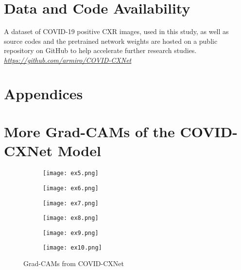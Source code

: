 \documentclass{article}
\begin{document}
\section*{Data and Code Availability}
A dataset of COVID-19 positive CXR images, used in this study, as well as source codes and the pretrained network weights are hosted on a public repository on GitHub to help accelerate further research studies.
\textit{\href{https://github.com/armiro/COVID-CXNet}{https://github.com/armiro/COVID-CXNet}}




\newpage
\appendix
\section*{Appendices}

\section{More Grad-CAMs of the COVID-CXNet Model} \label{appendix: B}

\begin{figure}[H]
\begin{subfigure}{0.4\linewidth}
        \centering
        \texttt{[image: ex5.png]}
        \label{fig:cx1_1}
    \end{subfigure}
    \hfill
    \begin{subfigure}{0.4\linewidth}
        \centering
        \texttt{[image: ex6.png]}
        \label{fig:cx1_2}
    \end{subfigure}
    \hfill
    \begin{subfigure}{0.4\linewidth}
        \centering
        \texttt{[image: ex7.png]}
        \label{fig:cx1_3}
    \end{subfigure}
    \hfill
    \begin{subfigure}{0.4\linewidth}
        \centering
        \texttt{[image: ex8.png]}
        \label{fig:cx1_4}
    \end{subfigure}
    \hfill
    \begin{subfigure}{0.4\linewidth}
        \centering
        \texttt{[image: ex9.png]}
        \label{fig:cx1_5}
    \end{subfigure}
    \hfill
    \begin{subfigure}{0.4\linewidth}
        \centering
        \texttt{[image: ex10.png]}
        \label{fig:cx1_6}
    \end{subfigure}
\caption{Grad-CAMs from COVID-CXNet}
\label{fig:more_roi_cxnet_1}
\end{figure}
\end{document}
